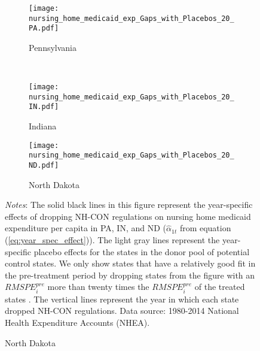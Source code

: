 \documentclass[../Main.tex]{subfiles}
\begin{document}
\newpage
\begin{figure}[t]
	\begin{center}
	\caption{\label{fig:medicaid_exp_gaps} \centering Year-Specific Effects of Dropping NH-CON on Medicaid Expenditure Per Capita ($\hat{\alpha}_{1t}$)}
    \begin{subfigure}[b]{\textwidth} \centering
    \caption{Pennsylvania}\texttt{[image: nursing\_home\_medicaid\_exp\_Gaps\_with\_Placebos\_20\_PA.pdf]}
    \end{subfigure}\\
    \vspace{.4cm}
    \begin{subfigure}[b]{.48\textwidth} \centering
    \caption{Indiana}\texttt{[image: nursing\_home\_medicaid\_exp\_Gaps\_with\_Placebos\_20\_IN.pdf]}
    \end{subfigure}\quad%
    \begin{subfigure}[b]{.48\textwidth} \centering
    \caption{North Dakota}\texttt{[image: nursing\_home\_medicaid\_exp\_Gaps\_with\_Placebos\_20\_ND.pdf]}
    \end{subfigure}
    \end{center}
    \footnotesize
		\textit{Notes}: The solid black lines in this figure represent the year-specific effects of dropping NH-CON regulations on nursing home medicaid expenditure per capita in PA, IN, and ND ($\hat{\alpha}_{1t}$ from equation (\ref{eq:year_spec_effect})). The light gray lines represent the year-specific placebo effects for the states in the donor pool of potential control states. We only show states that have a relatively good fit in the pre-treatment period by dropping states from the figure with an $RMSPE_i^{pre}$ more than twenty times the $RMSPE_i^{pre}$ of the treated states \citep{abadie2010synthetic}. The vertical lines represent the year in which each state dropped NH-CON regulations. Data source: 1980-2014 National Health Expenditure Accounts (NHEA).
\end{figure}
\clearpage

	
\end{document}
